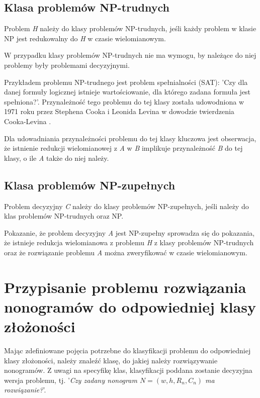 \subsection{Klasa problemów NP-trudnych}
\begin{definition}
    Problem \textit{H} należy do klasy problemów NP-trudnych, jeśli każdy problem w klasie NP 
jest redukowalny do \textit{H} w czasie wielomianowym.
\end{definition}
    W przypadku klasy problemów NP-trudnych nie ma wymogu, by należące do niej problemy były
problemami decyzyjnymi.
\begin{example}
    Przykładem problemu NP-trudnego jest problem spełnialności (SAT): 'Czy dla danej formuły logicznej
istnieje wartościowanie, dla którego zadana formuła jest spełniona?'. Przynależność tego problemu
do tej klasy została udowodniona w 1971 roku przez Stephena Cooka i Leonida Levina w dowodzie
twierdzenia Cooka-Levina \cite{Cook-Levin}.
\end{example}
    Dla udowadniania przynależności problemu do tej klasy kluczowa jest obserwacja, że istnienie
redukcji wielomianowej z \textit{A} w \textit{B} implikuje przynależność \textit{B} do tej klasy,
o ile \textit{A} także do niej należy.

\subsection{Klasa problemów NP-zupełnych}
\begin{definition}
    Problem decyzyjny \textit{C} należy do klasy problemów NP-zupełnych, jeśli należy do klas problemów
NP-trudnych oraz NP.
\end{definition}
\begin{corollary}
    Pokazanie, że problem decyzyjny \textit{A} jest NP-zupełny sprowadza się do pokazania, że istnieje redukcja
wielomianowa z problemu \textit{H} z klasy problemów NP-trudnych oraz że rozwiązanie problemu \textit{A}
można zweryfikować w czasie wielomianowym.
\end{corollary}



\section{Przypisanie problemu rozwiązania nonogramów do odpowiedniej klasy złożoności}

    Mając zdefiniowane pojęcia potrzebne do klasyfikacji problemu do odpowiedniej klasy złożoności,
należy znaleźć klasę, do jakiej należy rozwiązywanie nonogramów. Z uwagi na specyfikę klas, klasyfikacji
poddana zostanie decyzyjna wersja problemu, tj. 
'\textit{Czy zadany nonogram $N = (w, h, R_n, C_n)$ ma rozwiązanie?}'.


